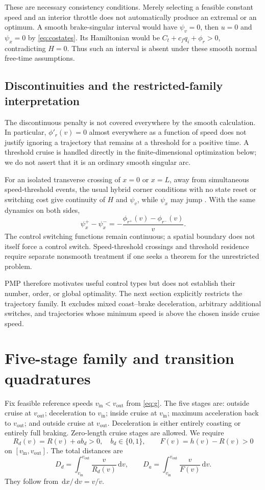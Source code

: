 \documentclass[10pt,a4paper]{article}
\newcommand{\dd}{\,\mathrm{d}}
\newcommand{\out}{\mathrm{out}}
\newcommand{\inn}{\mathrm{in}}
\begin{document}
These are necessary consistency conditions. Merely selecting a feasible constant speed and an interior throttle does not automatically produce an extremal or an optimum. A smooth brake-singular interval would have $\psi_v=0$, then $u=0$ and $\psi_x=0$ by \eqref{eq:costates}. Its Hamiltonian would be $C_t+c_fq_i+\phi_r>0$, contradicting $H=0$. Thus such an interval is absent under these smooth normal free-time assumptions.

\subsection{Discontinuities and the restricted-family interpretation}
The discontinuous penalty is not covered everywhere by the smooth calculation. In particular, $\phi'_r(v)=0$ almost everywhere as a function of speed does not justify ignoring a trajectory that remains at a threshold for a positive time. A threshold cruise is handled directly in the finite-dimensional optimization below; we do not assert that it is an ordinary smooth singular arc.

For an isolated transverse crossing of $x=0$ or $x=L$, away from simultaneous speed-threshold events, the usual hybrid corner conditions with no state reset or switching cost give continuity of $H$ and $\psi_v$, while $\psi_x$ may jump \cite{hybrid}. With the same dynamics on both sides,
\begin{equation}
\psi_x^+-\psi_x^-=-\frac{\phi_{r^+}(v)-\phi_{r^-}(v)}{v}.
\end{equation}
The control switching functions remain continuous; a spatial boundary does not itself force a control switch. Speed-threshold crossings and threshold residence require separate nonsmooth treatment if one seeks a theorem for the unrestricted problem.

PMP therefore motivates useful control types but does not establish their number, order, or global optimality. The next section explicitly restricts the trajectory family. It excludes mixed coast--brake deceleration, arbitrary additional switches, and trajectories whose minimum speed is above the chosen inside cruise speed.

\section{Five-stage family and transition quadratures}
\label{sec:family}
Fix feasible reference speeds $v_{\inn}<v_{\out}$ from \eqref{eq:g}. The five stages are: outside cruise at $v_{\out}$; deceleration to $v_{\inn}$; inside cruise at $v_{\inn}$; maximum acceleration back to $v_{\out}$; and outside cruise at $v_{\out}$. Deceleration is either entirely coasting or entirely full braking. Zero-length cruise stages are allowed. We require
\begin{equation}
R_d(v)=R(v)+ab_d>0,\quad b_d\in\{0,1\},\qquad
F(v)=h(v)-R(v)>0
\label{eq:denominators}
\end{equation}
on $[v_{\inn},v_{\out}]$. The total distances are
\begin{equation}
D_d=\int_{v_{\inn}}^{v_{\out}}\frac{v}{R_d(v)}\dd v,
\qquad
D_a=\int_{v_{\inn}}^{v_{\out}}\frac{v}{F(v)}\dd v.
\end{equation}
They follow from $\dd x/\dd v=v/\dot v$.
\end{document}
